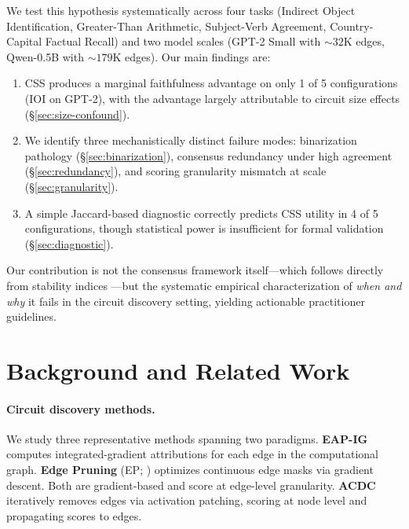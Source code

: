 \documentclass[11pt,a4paper]{article}
\newcommand{\css}{\textsc{CSS}}
\begin{document}
We test this hypothesis systematically across four tasks (Indirect Object Identification, Greater-Than Arithmetic, Subject-Verb Agreement, Country-Capital Factual Recall) and two model scales (GPT-2 Small with ${\sim}32$K edges, Qwen-0.5B with ${\sim}179$K edges). Our main findings are:

\begin{enumerate}[nosep,leftmargin=*]
    \item \css{} produces a marginal faithfulness advantage on only 1 of 5 configurations (IOI on GPT-2), with the advantage largely attributable to circuit size effects (\S\ref{sec:size-confound}).
    \item We identify three mechanistically distinct failure modes: binarization pathology (\S\ref{sec:binarization}), consensus redundancy under high agreement (\S\ref{sec:redundancy}), and scoring granularity mismatch at scale (\S\ref{sec:granularity}).
    \item A simple Jaccard-based diagnostic correctly predicts \css{} utility in 4 of 5 configurations, though statistical power is insufficient for formal validation (\S\ref{sec:diagnostic}).
\end{enumerate}

Our contribution is not the consensus framework itself---which follows directly from stability indices \cite{nogueira2016measuring,kuncheva2003measures}---but the systematic empirical characterization of \emph{when and why} it fails in the circuit discovery setting, yielding actionable practitioner guidelines.

\section{Background and Related Work}

\paragraph{Circuit discovery methods.}
We study three representative methods spanning two paradigms. \textbf{EAP-IG} \cite{syed2023attribution} computes integrated-gradient attributions for each edge in the computational graph. \textbf{Edge Pruning} (EP; \citealp{bhaskar2024finding}) optimizes continuous edge masks via gradient descent. Both are gradient-based and score at edge-level granularity. \textbf{ACDC} \cite{conmy2023towards} iteratively removes edges via activation patching, scoring at node level and propagating scores to edges.
\end{document}
